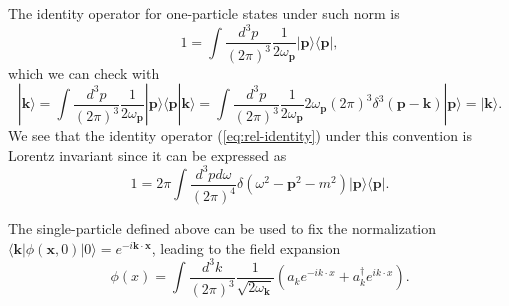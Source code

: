 \documentclass[aps,prb,superscriptaddress,nofootinbib]{revtex4}
\begin{document}
The identity operator for one-particle states under such norm is
\begin{equation}
	1=\int \frac{d^{3} p}{(2\pi)^{3}} \frac{1}{2\omega_{\bm p}}|\bm{p}\rangle\langle\bm{p}|, \label{eq:rel-identity}
\end{equation}
which we can check with
\begin{equation*}
	|\bm{k}\rangle
	=\int \frac{d^{3} p}{(2\pi)^{3}} \frac{1}{2\omega_{\bm p}}|\bm{p}\rangle\langle\bm{p}|\bm{k}\rangle
	=\int \frac{d^{3} p}{(2\pi)^{3}} \frac{1}{2\omega_{\bm p}} 2\omega_{\bm p}(2\pi)^3 \delta^3(\bm{p}-\bm{k})|\bm{p}\rangle
	=|\bm{k}\rangle.
\end{equation*}
We see that the identity operator (\ref{eq:rel-identity}) under this convention is Lorentz invariant since it can be expressed as
\begin{equation*}
	1 = 2\pi \int \frac{d^{3} p d\omega}{(2\pi)^{4}} \delta(\omega^2-{\bm{p}}^2-m^2) |\bm p\rangle\langle \bm p|.
\end{equation*}

The single-particle defined above can be used to fix the normalization $\langle \bm k|\phi(\bm x,0)|0\rangle = e^{-i \bm k\cdot \bm x}$, leading to the field expansion
\begin{equation}
	\phi(x)
	=\int \frac{d^{3} k}{(2\pi)^{3}} \frac{1}{\sqrt{2\omega_{\bm k}}}\left(a_k 
		e^{-i k \cdot x}+a_k^{\dagger} e^{i k \cdot x}\right).
\end{equation}
\end{document}
